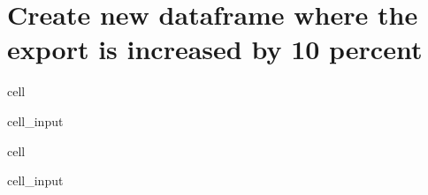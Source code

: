 \documentclass[letterpaper,10pt,english]{jupyterBook}
\begin{document}
\section{Create new dataframe where the export is increased by 10 percent}
\label{\detokenize{content/howto/smallmodel/modelstart export up:create-new-dataframe-where-the-export-is-increased-by-10-percent}}
\begin{sphinxuseclass}{cell}\begin{sphinxVerbatimInput}

\begin{sphinxuseclass}{cell_input}
\begin{sphinxVerbatim}[commandchars=\\\{\}]
  
\end{sphinxVerbatim}

\end{sphinxuseclass}\end{sphinxVerbatimInput}

\end{sphinxuseclass}
\begin{sphinxuseclass}{cell}\begin{sphinxVerbatimInput}

\begin{sphinxuseclass}{cell_input}
\begin{sphinxVerbatim}[commandchars=\\\{\}]
  
\end{sphinxVerbatim}

\end{sphinxuseclass}\end{sphinxVerbatimInput}

\end{sphinxuseclass}
\end{document}
